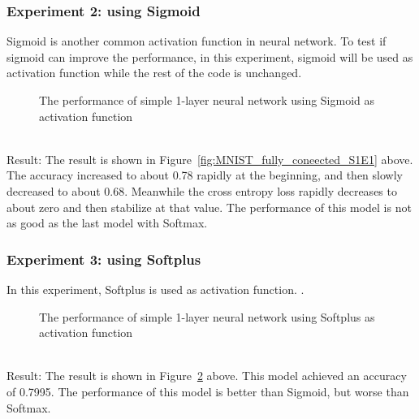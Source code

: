 \documentclass[]{UCD_CS_FYP_Report}
\begin{document}
\subsubsection{Experiment 2: using Sigmoid}
Sigmoid is another common activation function in neural network. To test if sigmoid can improve the performance, in this experiment, sigmoid will be used as activation function while the rest of the code is unchanged. 
\begin{figure}[h]
\centering
\fboxsep 2mm
\caption{\label{fig:MNIST_fully_coneected_S1E2} The performance of simple 1-layer neural network using Sigmoid as activation function}
\end{figure}
\\Result: The result is shown in Figure~\ref{fig:MNIST_fully_coneected_S1E1} above. The accuracy increased to about 0.78 rapidly at the beginning, and then slowly decreased to about 0.68. Meanwhile the cross entropy loss rapidly decreases to about zero and then stabilize at that value. The performance of this model is not as good as the last model with Softmax. 
\subsubsection{Experiment 3: using Softplus}
In this experiment, Softplus is used as activation function. . 
\begin{figure}[h]
\centering
\fboxsep 2mm
\caption{\label{fig:MNIST_fully_coneected_S1E3} The performance of simple 1-layer neural network using Softplus as activation function}
\end{figure}
\\Result: The result is shown in Figure~\ref{fig:MNIST_fully_coneected_S1E3} above. This model achieved an accuracy of 0.7995. The performance of this model is better than Sigmoid, but worse than Softmax.
\end{document}

